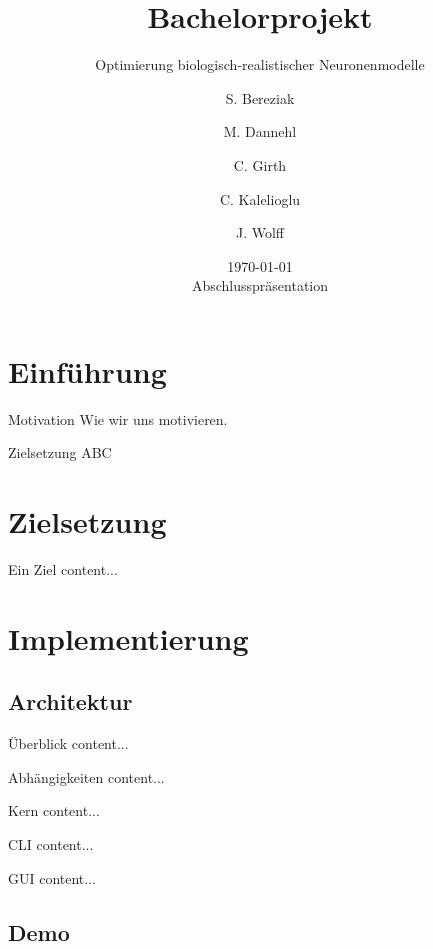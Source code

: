\documentclass[german,10pt,xcolor=colortbl,compress
]{beamer}
\title{Bachelorprojekt }
\subtitle{Optimierung biologisch-realistischer Neuronenmodelle}
\date[]{\today\\[1ex]Abschlusspräsentation}
\author[]{S. Bereziak \and M. Dannehl \and C. Girth \and C. Kalelioglu \and J. Wolff}
\institute[Universität zu Lübeck]{Institut für Robotik und kognitive Systeme\\Universität zu Lübeck}
\begin{document}
	\maketitle
	\begin{frame}
		\tableofcontents
	\end{frame}	
	\section{Einführung}
	\begin{frame}{Motivation}
	Wie wir uns motivieren.
	\end{frame}
	\begin{frame}{Zielsetzung}
	ABC
	\end{frame}
	
	\section{Zielsetzung}
	\begin{frame}{Ein Ziel}
	content...
	\end{frame}
	\section{Implementierung}
	\subsection{Architektur}
	
	\begin{frame}{Überblick}
	content...
	\end{frame}
	\begin{frame}{Abhängigkeiten}
	content...
	\end{frame}
	\begin{frame}{Kern}
	content...
	\end{frame}

	\begin{frame}{CLI}
	content...
	\end{frame}

	\begin{frame}{GUI}
	content...
	\end{frame}
	
	\subsection{Demo}
\end{document}
